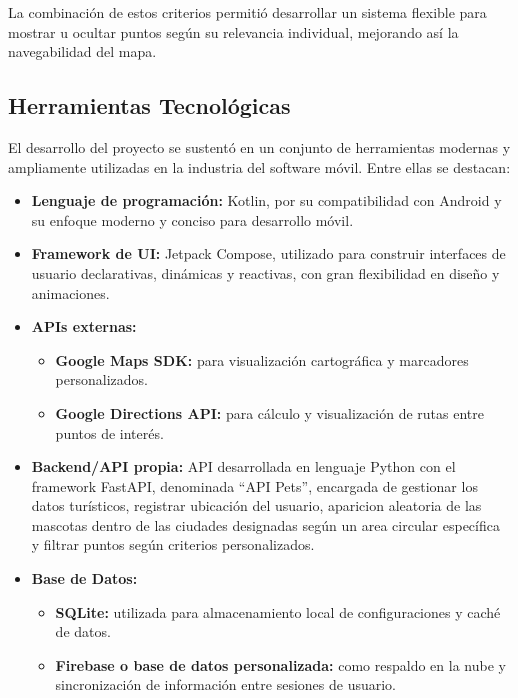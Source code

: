 \documentclass[12pt]{article}
\begin{document}
La combinación de estos criterios permitió desarrollar un sistema flexible para mostrar u ocultar puntos según su relevancia individual, mejorando así la navegabilidad del mapa.

\subsection*{Herramientas Tecnológicas}

El desarrollo del proyecto se sustentó en un conjunto de herramientas modernas y ampliamente utilizadas en la industria del software móvil. Entre ellas se destacan:

\begin{itemize}
    \item \textbf{Lenguaje de programación:} Kotlin, por su compatibilidad con Android y su enfoque moderno y conciso para desarrollo móvil.
    
    \item \textbf{Framework de UI:} Jetpack Compose, utilizado para construir interfaces de usuario declarativas, dinámicas y reactivas, con gran flexibilidad en diseño y animaciones.
    
    \item \textbf{APIs externas:}
    \begin{itemize}
        \item \textbf{Google Maps SDK:} para visualización cartográfica y marcadores personalizados.
        \item \textbf{Google Directions API:} para cálculo y visualización de rutas entre puntos de interés.
    \end{itemize}
    
    \item \textbf{Backend/API propia:} API desarrollada en lenguaje Python con el framework FastAPI, denominada “API Pets”, encargada de gestionar los datos turísticos, registrar ubicación del usuario, aparicion aleatoria de las mascotas dentro de las ciudades designadas según un area circular específica y filtrar puntos según criterios personalizados.
    
    \item \textbf{Base de Datos:}
    \begin{itemize}
        \item \textbf{SQLite:} utilizada para almacenamiento local de configuraciones y caché de datos.
        \item \textbf{Firebase o base de datos personalizada:} como respaldo en la nube y sincronización de información entre sesiones de usuario.
    \end{itemize}
    

\end{itemize}
\end{document}
